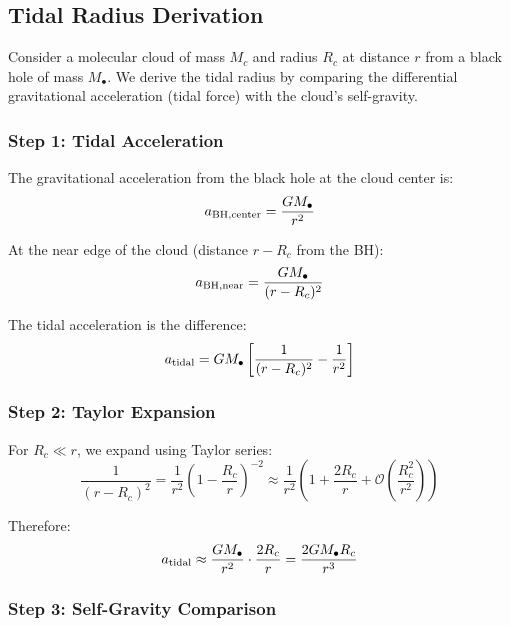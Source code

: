 \documentclass[twocolumn,amsmath,amssymb,prd,superscriptaddress,nofootinbib]{revtex4-2}
\begin{document}
\subsection{Tidal Radius Derivation}
\label{sec:tidal_radius}

Consider a molecular cloud of mass $M_c$ and radius $R_c$ at distance $r$ from a black hole of mass $M_\bullet$. We derive the tidal radius by comparing the differential gravitational acceleration (tidal force) with the cloud's self-gravity.

\subsubsection{Step 1: Tidal Acceleration}

The gravitational acceleration from the black hole at the cloud center is:
\begin{equation}
    a_{\rm BH,center} = \frac{GM_\bullet}{r^2}
\end{equation}

At the near edge of the cloud (distance $r - R_c$ from the BH):
\begin{equation}
    a_{\rm BH,near} = \frac{GM_\bullet}{(r-R_c)^2}
\end{equation}

The tidal acceleration is the difference:
\begin{equation}
    a_{\rm tidal} = GM_\bullet\left[\frac{1}{(r-R_c)^2} - \frac{1}{r^2}\right]
\end{equation}

\subsubsection{Step 2: Taylor Expansion}

For $R_c \ll r$, we expand using Taylor series:
\begin{equation}
    \frac{1}{(r-R_c)^2} = \frac{1}{r^2}\left(1 - \frac{R_c}{r}\right)^{-2} \approx \frac{1}{r^2}\left(1 + \frac{2R_c}{r} + \mathcal{O}\left(\frac{R_c^2}{r^2}\right)\right)
\end{equation}

Therefore:
\begin{equation}
    a_{\rm tidal} \approx \frac{GM_\bullet}{r^2} \cdot \frac{2R_c}{r} = \frac{2GM_\bullet R_c}{r^3}
    \label{eq:a_tidal}
\end{equation}

\subsubsection{Step 3: Self-Gravity Comparison}
\end{document}
